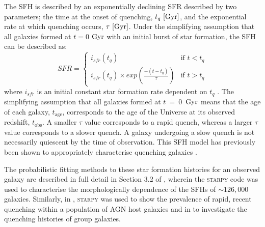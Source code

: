 \documentclass[useAMS,usenatbib]{mn2e}
\begin{document}
The SFH is described by an exponentially declining SFR described by two parameters; the time at the onset of quenching, $t_q~\rm{[Gyr]}$, and the exponential rate at which quenching occurs, $\tau~\rm{[Gyr]}$. Under the simplifying assumption that all galaxies formed at $t=0$ $\rm{ Gyr}$ with an initial burst of star formation, the SFH can be described as:
\begin{equation}\label{sfh}
SFR =
\begin{cases}
i_{sfr}(t_q) & \text{if } t < t_q \\
i_{sfr}(t_q) \times exp{\left( \frac{-(t-t_{q})}{\tau}\right)} & \text{if } t > t_q 
\end{cases}
\end{equation}
where $i_{sfr}$ is an initial constant star formation rate dependent on $t_q$ \citep{schawinski14, smethurst15}. The simplifying assumption that all galaxies formed at $t~=~0$~$\rm{Gyr}$ means that the age of each galaxy, $t_\mathrm{age}$, corresponds to the age of the Universe at its observed redshift, $t_\mathrm{obs}$. A smaller $\tau$ value corresponds to a rapid quench, whereas a larger $\tau$ value corresponds to a slower quench. A galaxy undergoing a slow quench is not necessarily quiescent by the time of observation. This SFH model has previously been shown to appropriately characterise quenching galaxies \citep{Weiner06, Martin07, Noeske07,schawinski14}. 

The probabilistic fitting methods to these star formation histories for an observed galaxy are described in full detail in Section 3.2 of \cite{smethurst15}, wherein the \textsc{starpy} code was used to characterise the morphologically dependence of the SFHs of $\sim126,000$ galaxies. Similarly, in \cite{smethurst16}, \textsc{starpy} was used to show the prevalence of rapid, recent quenching within a population of AGN host galaxies and in \cite{smethurst17} to investigate the quenching histories of group galaxies.  
\end{document}
